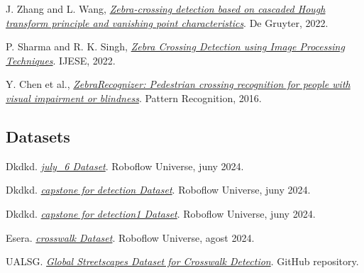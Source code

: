 \documentclass[10pt,a4paper,twocolumn,twoside]{article}
\begin{document}
\begin{thebibliography}{9}
	J. Zhang and L. Wang, \textit{\href{https://www.degruyterbrill.com/document/doi/10.1515/comp-2022-0260/html}{Zebra-crossing detection based on cascaded Hough transform principle and vanishing point characteristics}}. De Gruyter, 2022.
	
	P. Sharma and R. K. Singh, \textit{\href{https://www.ijese.org/wp-content/uploads/Papers/v13i3/B104214020125.pdf}{Zebra Crossing Detection using Image Processing Techniques}}. IJESE, 2022.
	
	Y. Chen et al., \textit{\href{https://www.sciencedirect.com/science/article/abs/pii/S0031320316300826}{ZebraRecognizer: Pedestrian crossing recognition for people with visual impairment or blindness}}. Pattern Recognition, 2016.
	
	\subsection*{Datasets}
	
	Dkdkd. \href{https://universe.roboflow.com/dkdkd/july_6}{\textit{july\_6 Dataset}}. Roboflow Universe, juny 2024.
	
	Dkdkd. \href{https://universe.roboflow.com/dkdkd/capstone-for-detection}{\textit{capstone for detection Dataset}}. Roboflow Universe, juny 2024.
	
	Dkdkd. \href{https://universe.roboflow.com/dkdkd/capstone-for-detection1}{\textit{capstone for detection1 Dataset}}. Roboflow Universe, juny 2024.
	
	Esera. \href{https://universe.roboflow.com/esera/crosswalk-cz3sx}{\textit{crosswalk Dataset}}. Roboflow Universe, agost 2024.
	
	UALSG. \href{https://github.com/ualsg/global-streetscapes}{\textit{Global Streetscapes Dataset for Crosswalk Detection}}. GitHub repository.
	
	
	
\end{thebibliography}
\end{document}
